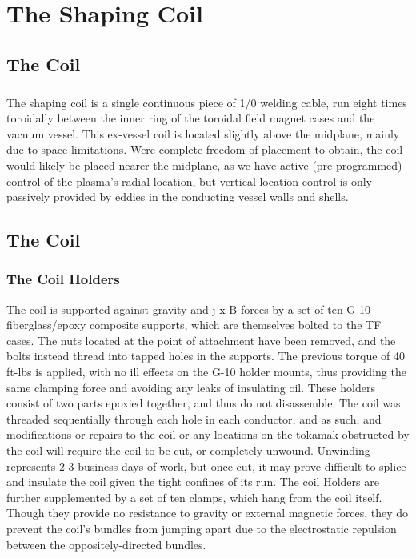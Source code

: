 \chapter{The Shaping Coil}
\section{The Coil}
\paragraph{} The shaping coil is a single continuous piece of 1/0 welding cable, run eight times toroidally between the inner ring of the toroidal field magnet cases and the vacuum vessel.  This ex-vessel coil is located slightly above the midplane, mainly due to space limitations.  Were complete freedom of placement to obtain, the coil would likely be placed nearer the midplane, as we have active (pre-programmed) control of the plasma's radial location, but vertical location control is only passively provided by eddies in the conducting vessel walls and shells.
\section{The Coil}
\subsection{The Coil Holders}
The coil is supported against gravity and j x B forces by a set of ten  G-10 fiberglass/epoxy composite supports, which are themselves bolted to the TF cases.  The nuts located at the point of attachment have been removed, and the bolts instead thread into tapped holes in the supports.  The previous torque of 40 ft-lbs is applied, with no ill effects on the G-10 holder mounts, thus providing the same clamping force and avoiding any leaks of insulating oil.
These holders consist of two parts epoxied together, and thus do not disassemble.  The coil was threaded sequentially through each hole in each conductor, and as such, and modifications or repairs to the coil or any locations on the tokamak obstructed by the coil will require the coil to be cut, or completely unwound.  Unwinding represents 2-3 business days of work, but once cut, it may prove difficult to splice and insulate the coil given the tight confines of its run.
The coil Holders are further supplemented by a set of ten clamps, which hang from the coil itself.  Though they provide no resistance to gravity or external magnetic forces, they do prevent the coil's bundles from jumping apart due to the electrostatic repulsion between the oppositely-directed bundles.
